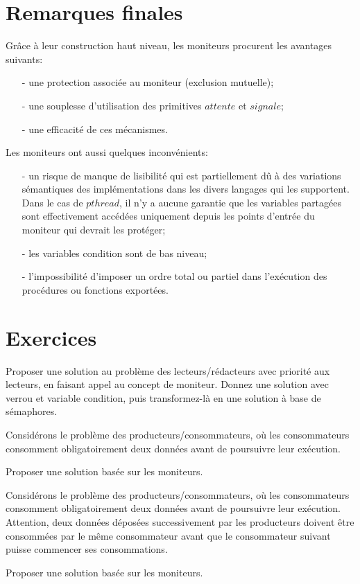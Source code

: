 \section{Remarques finales}
Grâce à leur construction haut niveau, les moniteurs procurent les avantages suivants:
\begin{itemize}
\item[-] une protection associée au moniteur (exclusion mutuelle);
\item[-] une souplesse d'utilisation des primitives $attente$ et $signale$;
\item[-] une efficacité de ces mécanismes.
\end{itemize}
Les moniteurs ont aussi quelques inconvénients:
\begin{itemize}
\item[-] un risque de manque de lisibilité qui est partiellement dû à des variations sémantiques des implémentations dans les divers langages qui les supportent. Dans le cas de $pthread$, il n'y a aucune garantie que les variables partagées sont effectivement accédées uniquement depuis les points d'entrée du moniteur qui devrait les protéger;
\item[-] les variables condition sont de bas niveau;
\item[-] l'impossibilité d'imposer un ordre total ou partiel dans l'exécution des procédures ou fonctions exportées.
\end{itemize}


\section{Exercices}

\startexercice

Proposer une solution au problème des lecteurs/rédacteurs avec priorité aux lecteurs, en faisant appel au concept de moniteur. Donnez une solution avec verrou et variable condition, puis transformez-là en une solution à base de sémaphores.

\startexercice

Considérons le problème des producteurs/consommateurs, où les consommateurs consomment obligatoirement deux données avant de poursuivre leur exécution.

Proposer une solution basée sur les moniteurs.

\startexercice

Considérons le problème des producteurs/consommateurs, où les consommateurs consomment obligatoirement deux données avant de poursuivre leur exécution. Attention, deux données déposées successivement par les producteurs doivent être consommées par le même consommateur avant que le consommateur suivant puisse commencer ses consommations.

Proposer une solution basée sur les moniteurs.
